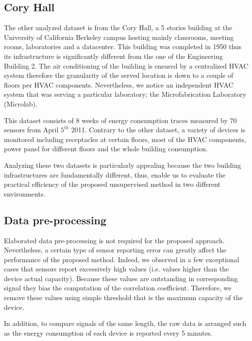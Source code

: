 
\subsection{Cory Hall}
The other analyzed dataset is from the Cory Hall, a 5 stories building at the University of California Berkeley campus hosting mainly classrooms, meeting rooms, laboratories and a datacenter.
This building was completed in 1950 thus its infrastructure is significantly different from the one of the Engineering Building 2.
The air conditioning of the building is ensured by a centralized HVAC system therefore the granularity of the served location is down to a couple of floors per HVAC components.
Nevertheless, we notice an independent HVAC system that was serving a particular laboratory; the Microfabrication Laboratory (Microlab).

This dataset consists of 8 weeks of energy consumption traces measured by 70 sensors from April $5^{th}$ 2011.
Contrary to the other dataset, a variety of devices is monitored including receptacles at certain floors, most of the HVAC components, power panel for different floors and the whole building consumption.

Analyzing these two datasets is particularly appealing because the two building infrastructures are fundamentally different, thus, enable us to evaluate the practical efficiency of the proposed unsupervised method in two different environments.


\subsection{Data pre-processing}
Elaborated data pre-processing is not required for the proposed approach.
Nevertheless, a certain type of sensor reporting error can greatly affect the performance of the proposed method.
Indeed, we observed in a few exceptional cases that sensors report excessively high values (i.e. values higher than the device actual capacity).
Because these values are outstanding in corresponding signal they bias the computation of the correlation coefficient.
Therefore, we remove these values using simple threshold that is the maximum capacity of the device.

In addition, to compare signals of the same length, the raw data is arranged such as the energy consumption of each device is reported every 5 minutes. 

